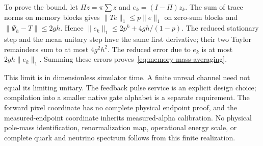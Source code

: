 To prove the bound, let $\Pi z=\pi\sum z$ and $e_k=(I-\Pi)z_k$.
The sum of trace norms on memory blocks gives
$\|Te\|_1\le p\|e\|_1$ on zero-sum blocks and
$\|\Psi_h-T\|\le2gh$. Hence
$\|e_k\|_1\le2p^k+4gh/(1-p)$.
The reduced stationary step and the mean unitary step have the same first
derivative; their two Taylor remainders sum to at most $4g^2h^2$.
The reduced error due to $e_k$ is at most $2gh\|e_k\|_1$.
Summing these errors proves~\eqref{eq:memory-mass-averaging}.

This limit is in dimensionless simulator time. A finite unread channel
need not equal its limiting unitary. The feedback pulse service is an
explicit design choice; compilation into a smaller native gate alphabet
is a separate requirement. The forward pixel coordinate has no complete
physical endpoint proof, and the measured-endpoint coordinate inherits
measured-alpha calibration. No physical pole-mass identification,
renormalization map, operational energy scale, or complete quark and
neutrino spectrum follows from this finite realization.
